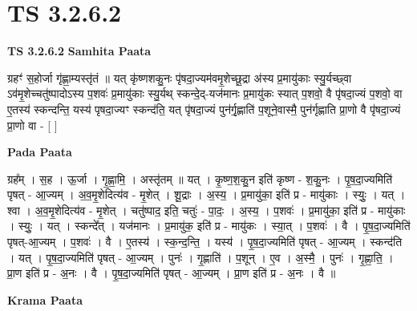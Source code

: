 \documentclass[17pt]{extarticle}
\begin{document}
\section{ TS 3.2.6.2 }

\textbf{TS 3.2.6.2 } \newline
\textbf{Samhita Paata} \newline

ग्रहꣳ॑ स॒होर्जा गृ॑ह्णा॒म्यस्तृ॑तं ॥ यत् कृ॑ष्णशकु॒नः पृ॑षदा॒ज्यम॑वमृ॒शेच्छू॒द्रा अ॑स्य प्र॒मायु॑काः स्यु॒र्यच्छ्वा ऽव॑मृ॒शेच्चतु॑ष्पादोऽस्य प॒शवः॑ प्र॒मायु॑काः स्यु॒र्यथ् स्कन्दे॒द्-यज॑मानः प्र॒मायु॑कः स्यात् प॒शवो॒ वै पृ॑षदा॒ज्यं प॒शवो॒ वा ए॒तस्य॑ स्कन्दन्ति॒ यस्य॑ पृषदा॒ज्यꣳ स्कन्द॑ति॒ यत् पृ॑षदा॒ज्यं पुन॑र्गृ॒ह्णाति॑ प॒शूने॒वास्मै॒ पुन॑र्गृह्णाति प्रा॒णो वै पृ॑षदा॒ज्यं प्रा॒णो वा - [  ] \newline

\textbf{Pada Paata} \newline

ग्रह᳚म् । स॒ह । ऊ॒र्जा । गृ॒ह्णा॒मि॒ । अस्तृ॑तम् ॥ यत् । कृ॒ष्ण॒श॒कु॒न इति॑ कृष्ण - श॒कु॒नः । पृ॒ष॒दा॒ज्यमिति॑ पृषत् - आ॒ज्यम् । अ॒व॒मृ॒शेदित्य॑व - मृ॒शेत् । शू॒द्राः । अ॒स्य॒ । प्र॒मायु॑का॒ इति॑ प्र - मायु॑काः । स्युः॒ । यत् । श्वा । अ॒व॒मृ॒शेदित्य॑व - मृ॒शेत् । चतु॑ष्पाद॒ इति॒ चतुः॑ - पा॒दः॒ । अ॒स्य॒ । प॒शवः॑ । प्र॒मायु॑का॒ इति॑ प्र - मायु॑काः । स्युः॒ । यत् । स्कन्दे᳚त् । यज॑मानः । प्र॒मायु॑क॒ इति॑ प्र - मायु॑कः । स्या॒त् । प॒शवः॑ । वै । पृ॒ष॒दा॒ज्यमिति॑ पृषत्-आ॒ज्यम् । प॒शवः॑ । वै । ए॒तस्य॑ । स्क॒न्द॒न्ति॒ । यस्य॑ । पृ॒ष॒दा॒ज्यमिति॑ पृषत् - आ॒ज्यम् । स्कन्द॑ति । यत् । पृ॒ष॒दा॒ज्यमिति॑ पृषत् - आ॒ज्यम् । पुनः॑ । गृ॒ह्णाति॑ । प॒शून् । ए॒व । अ॒स्मै॒ । पुनः॑ । गृ॒ह्णा॒ति॒ । प्रा॒ण इति॑ प्र - अ॒नः । वै । पृ॒ष॒दा॒ज्यमिति॑ पृषत् - आ॒ज्यम् । प्रा॒ण इति॑ प्र - अ॒नः । वै ॥  \newline


\textbf{Krama Paata} \newline
\end{document}
